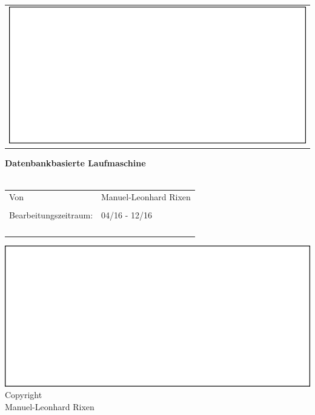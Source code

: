 \begin{titlepage}

\hspace{9cm}
\begin{minipage}{1in}
\begin{tabular}{l}
\includegraphics[width=2\textwidth]{03_Grafiken/pseudoImage.png}
\end{tabular}
\end{minipage}
\begin{center}
\vfill
{ \huge \textbf{Datenbankbasierte Laufmaschine} }\\[0.4cm]
{ \LARGE \textbf{} }\\[0.4cm]
\end{center}
\begin{center}
\vfill
\begin{tabular}{p{5cm}l}
Von & Manuel-Leonhard Rixen  \\
 &   \\
Bearbeitungszeitraum: & 04/16 - 12/16 \\
 &  \\ 
 &  \\ 
 &  \\
 & 
\end{tabular} 

\end{center}
\vfill
\begin{center}
%
%
\includegraphics[width=1.0\textwidth]{03_Grafiken/pseudoImage.png}
\vfill
Copyright \\
Manuel-Leonhard Rixen \\

\end{center}
\end{titlepage}